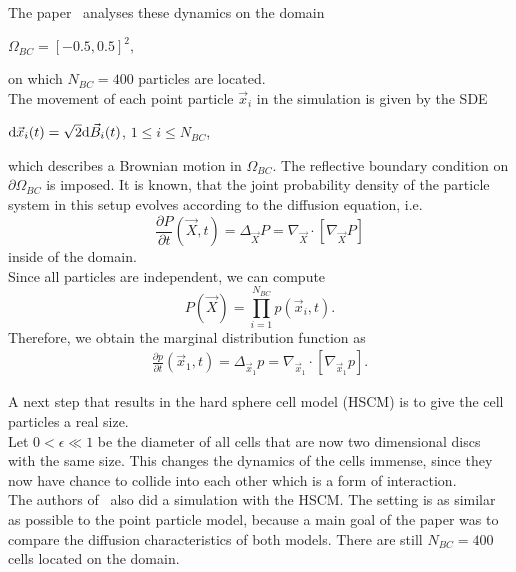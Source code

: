 The paper~\cite{Bruna2012} analyses these dynamics on the domain 
\begin{center}
    $
    \Omega_{BC} = [-0.5, 0.5]^2,
    $
\end{center}
on which $N_{BC} = 400$ particles are located. \\
The movement of each point particle $\vec{x}_i$ in the simulation is given by the SDE
\begin{center}
    $\mathrm{d} \vec{x}_i(t) = \sqrt{2} \mathrm{d} \vec{B}_i(t)$, \hspace{0.5em} $1 \leq i \leq N_{BC}$,
\end{center}
which describes a Brownian motion in $\Omega_{BC}$.
The reflective boundary condition on $\partial \Omega_{BC}$ is imposed.
It is known, that the joint probability density of the particle system in this setup evolves according to the diffusion equation, i.e.
\begin{equation}
    \frac{\partial P}{\partial t}(\vec{X}, t) = \Delta_{\vec{X}} P = \nabla_{\vec{X}} \cdot [ \nabla_{\vec{X}} P]
    \label{eq:heat}
\end{equation}
inside of the domain. \\
Since all particles are independent, we can compute
\begin{equation}
    P(\vec{X}) = \prod_{i=1}^{N_{BC}} p(\vec{x}_i, t).
\end{equation}
Therefore, we obtain the marginal distribution function as 
\begin{align}
    \label{equ:marginalHeat}
    \frac{\partial p}{\partial t}(\vec{x}_1, t) = \Delta_{\vec{x}_1} p = \nabla_{\vec{x}_1} \cdot [ \nabla_{\vec{x}_1} p].
\end{align}

A next step that results in the hard sphere cell model (HSCM) is to give the cell particles a real size. \\
Let $0 < \epsilon \ll 1$ be the diameter of all cells that are now two dimensional discs with the same size. 
This changes the dynamics of the cells immense, since they now have chance to collide into each other which is a form of interaction. \\
The authors of~\cite{Bruna2012} also did a simulation with the HSCM. 
The setting is as similar as possible to the point particle model, because a main goal of the paper was to compare the diffusion characteristics of both models. 
There are still $N_{BC} = 400$ cells located on the domain. \\

